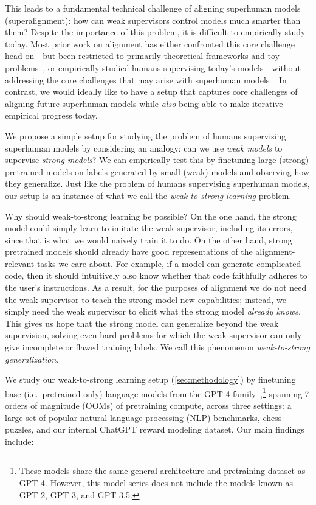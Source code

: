 This leads to a fundamental technical challenge of aligning superhuman models (superalignment): how can weak supervisors control models much smarter than them? Despite the importance of this problem, it is difficult to empirically study today. Most prior work on alignment has either confronted this core challenge head-on---but been restricted to primarily theoretical frameworks and toy problems~\citep{irving2018ai,christiano2018supervising,leike2018scalable,demski2019embedded,hubinger2019risks}, or empirically studied humans supervising today's models---without addressing the core challenges that may arise with superhuman models~\citep{christiano2017deep, wu2021recursively,ouyang2022training,bowman2022measuring,saunders2022self}. In contrast, we would ideally like to have a setup that captures core challenges of aligning future superhuman models while \textit{also} being able to make iterative empirical progress today. 

We propose a simple setup for studying the problem of humans supervising superhuman models by considering an analogy: can we use \textit{weak models} to supervise \textit{strong models}? We can empirically test this by finetuning large (strong) pretrained models on labels generated by small (weak) models and observing how they generalize. Just like the problem of humans supervising superhuman models, our setup is an instance of what we call the \textit{weak-to-strong learning} problem.

Why should weak-to-strong learning be possible? On the one hand, the strong model could simply learn to imitate the weak supervisor, including its errors, since that is what we would naively train it to do. On the other hand, strong pretrained models should already have good representations of the alignment-relevant tasks we care about. For example, if a model can generate complicated code, then it should intuitively also know whether that code faithfully adheres to the user's instructions. As a result, for the purposes of alignment we do not need the weak supervisor to teach the strong model new capabilities; instead, we simply need the weak supervisor to elicit what the strong model \textit{already knows}. This gives us hope that the strong model can generalize beyond the weak supervision, solving even hard problems for which the weak supervisor can only give incomplete or flawed training labels. We call this phenomenon \textit{weak-to-strong generalization}.

We study our weak-to-strong learning setup (\ref{sec:methodology}) by finetuning base (i.e.\ pretrained-only) language models from the GPT-4 family~\citep{openai2023gpt},\footnote{These models share the same general architecture and pretraining dataset as GPT-4. However, this model series does not include the models known as GPT-2, GPT-3, and GPT-3.5.} spanning 7 orders of magnitude (OOMs) of pretraining compute, across three settings: a large set of popular natural language processing (NLP) benchmarks, chess puzzles, and our internal ChatGPT reward modeling dataset. Our main findings include:

